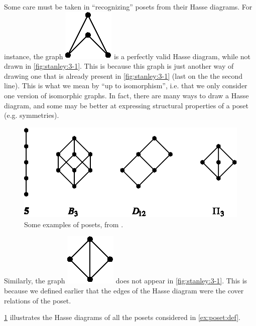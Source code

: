 Some care must be taken in ``recognizing'' posets from their Hasse diagrams.
For instance, the graph \includegraphics{fig/stanley/3-1:a} is a perfectly
valid Hasse diagram, while not drawn in \ref{fig:stanley:3-1}. This is because
this graph is just another way of drawing one that is already present in
\ref{fig:stanley:3-1} (last on the the second line).
This is what we mean by ``up to isomorphism'', i.e. that we only consider one
version of isomorphic graphs. In fact, there are many ways to draw a Hasse
diagram, and some may be better at expressing structural properties of a poset
(e.g. symmetries).


\begin{figure}
	\centering
	\includegraphics[height=0.2\textheight]{fig/stanley/3-2}
	\caption{\label{fig:stanley:3-2} Some examples of posets, from
\citet*{Stanley:2011:ECV:2124415}.}
\end{figure}


Similarly, the graph \includegraphics{fig/stanley/3-1:b} does not appear in
\ref{fig:stanley:3-1}.  This is because we defined earlier that the edges of
the Hasse diagram were the cover relations of the poset.


\ref{fig:stanley:3-2} illustrates the Hasse diagrams of all the posets
considered in \ref{ex:poset:def}.

